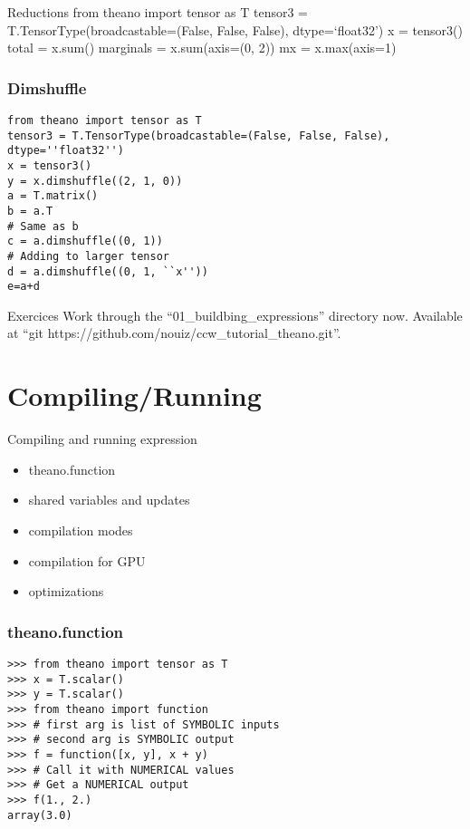 \documentclass[utf8x,xcolor=pdftex,dvipsnames,table]{beamer}
\begin{document}
\begin{frame}{Reductions}
from theano import tensor as T
tensor3 =
T.TensorType(broadcastable=(False,
False, False), dtype=‘float32’)
x = tensor3()
total = x.sum()
marginals = x.sum(axis=(0, 2))
mx = x.max(axis=1)
\end{frame}

\begin{frame}[fragile]
  \frametitle{Dimshuffle}

\begin{lstlisting}
from theano import tensor as T
tensor3 = T.TensorType(broadcastable=(False, False, False), dtype=''float32'')
x = tensor3()
y = x.dimshuffle((2, 1, 0))
a = T.matrix()
b = a.T
# Same as b
c = a.dimshuffle((0, 1))
# Adding to larger tensor
d = a.dimshuffle((0, 1, ``x''))
e=a+d
\end{lstlisting}
\end{frame}

\begin{frame}{Exercices}
  Work through the ``01\_buildbing\_expressions'' directory now.
  Available at ``git https://github.com/nouiz/ccw\_tutorial\_theano.git''.
\end{frame}

\section{Compiling/Running}
\begin{frame}{Compiling and running expression}  
  \begin{itemize}
  \item theano.function
  \item shared variables and updates
  \item compilation modes
  \item compilation for GPU
  \item optimizations
  \end{itemize}
\end{frame}

\begin{frame}[fragile]
  \frametitle{theano.function}

\begin{lstlisting}
>>> from theano import tensor as T
>>> x = T.scalar()
>>> y = T.scalar()
>>> from theano import function
>>> # first arg is list of SYMBOLIC inputs
>>> # second arg is SYMBOLIC output
>>> f = function([x, y], x + y)
>>> # Call it with NUMERICAL values
>>> # Get a NUMERICAL output
>>> f(1., 2.)
array(3.0)
\end{lstlisting}
\end{frame}
\end{document}
